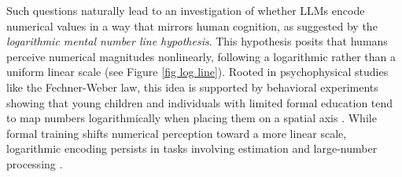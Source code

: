 Such questions naturally lead to an investigation of whether LLMs encode numerical values in a way that mirrors human cognition, as suggested by the \textit{logarithmic mental number line hypothesis}. This hypothesis posits that humans perceive numerical magnitudes nonlinearly, following a logarithmic rather than a uniform linear scale (see Figure \ref{fig log line}). Rooted in psychophysical studies like the Fechner-Weber law, this idea is supported by behavioral experiments showing that young children and individuals with limited formal education tend to map numbers logarithmically when placing them on a spatial axis \cite{fechner1860elemente, dehaene2003neural, siegler2003development}. While formal training shifts numerical perception toward a more linear scale, logarithmic encoding persists in tasks involving estimation and large-number processing \cite{dehaene2008log, moeller2009children}. 




